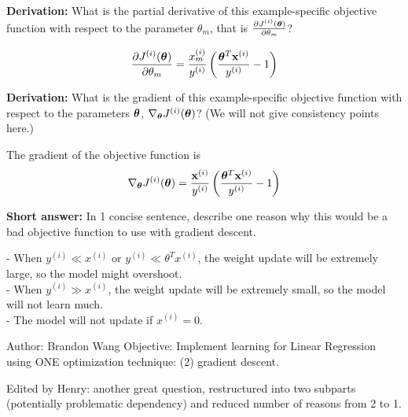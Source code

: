 \begin{parts}
    \begin{subparts}
    
    \subpart[2] \textbf{Derivation:} What is the partial derivative of this example-specific objective function with respect to the parameter $\theta_m$, that is $\frac{\partial J^{(i)}(\boldsymbol \theta)}{\partial \theta_m}$?
    \begin{tcolorbox}[fit,height=4cm, width=15cm, blank, borderline={1pt}{-2pt}]
    \end{tcolorbox}
    \begin{soln}
        $$\frac{\partial J^{(i)}(\boldsymbol \theta)}{\partial \theta_m} = \frac{x_m^{(i)}}{y^{(i)}} \left(\frac{\boldsymbol \theta^T\mathbf{x}^{(i)}}{y^{(i)}} - 1\right)$$
    \end{soln}

    \subpart[2] \textbf{Derivation:} What is the gradient of this example-specific objective function with respect to the parameters $\boldsymbol \theta$, $\nabla_{\boldsymbol \theta}J^{(i)}(\boldsymbol \theta)$? {\tiny (We will not give consistency points here.)}
    \begin{tcolorbox}[fit,height=4cm, width=15cm, blank, borderline={1pt}{-2pt}]
    \end{tcolorbox}
    \begin{soln}
        The gradient of the objective function is
        $$\nabla_{\boldsymbol \theta}J^{(i)}(\boldsymbol \theta) = \frac{\mathbf{x}^{(i)}}{y^{(i)}} \left(\frac{\boldsymbol \theta^T\mathbf{x}^{(i)}}{y^{(i)}} - 1\right)$$
    \end{soln}
    
    
    \subpart[2] \textbf{Short answer:} In 1 concise sentence, describe one reason why this would be a bad objective function to use with gradient descent.
    \fillwithlines{6em}
    \begin{soln}
    - When $y^{(i)}\ll x^{(i)}$ or $y^{(i)}\ll \theta^Tx^{(i)}$, the weight update will be extremely large, so the model might overshoot.\\
    - When $y^{(i)}\gg x^{(i)}$, the weight update will be extremely small, so the model will not learn much.\\
    - The model will not update if $x^{(i)}=0$.\\
    \end{soln}
    \begin{qauthor}
        Author: Brandon Wang
        Objective: Implement learning for Linear Regression using ONE optimization technique: (2) gradient descent.
        
        Edited by Henry: another great question, restructured into two subparts (potentially problematic dependency) and reduced number of reasons from 2 to 1. 
    \end{qauthor}


\end{subparts}
\end{parts}
